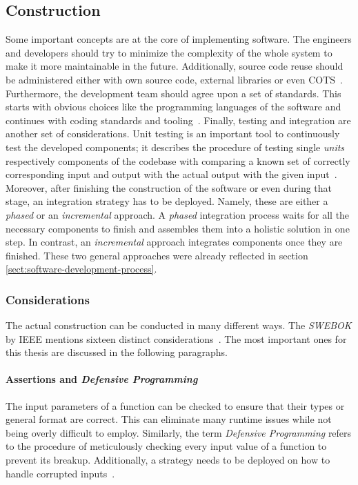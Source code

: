 \documentclass[12pt,a4paper]{report}
\begin{document}
\subsection{Construction} \label{subsect:construction}

Some important concepts are at the core of implementing software.
The engineers and developers should try to minimize the complexity of the whole system
to make it more maintainable in the future.
Additionally, source code reuse should be administered either with own source code,
external libraries or even COTS~\cite{swebok}.
Furthermore, the development team should agree upon a set of standards.
This starts with obvious choices like the programming languages of the software
and continues with coding standards and tooling~\cite{mcconnell-code-complete}.
Finally, testing and integration are another set of considerations.
Unit testing is an important tool to continuously test the developed components;
it describes the procedure of testing single \textit{units} respectively components
of the codebase with comparing a known set of correctly corresponding input and output
with the actual output with the given input~\cn.
Moreover, after finishing the construction of the software or even during that stage,
an integration strategy has to be deployed. Namely, these are either a
\textit{phased} or an \textit{incremental} approach. A \textit{phased} integration
process waits for all the necessary components to finish and assembles them into a
holistic solution in one step. In contrast, an \textit{incremental} approach
integrates components once they are finished. These two general approaches
were already reflected in section \ref{sect:software-development-process}.

\subsubsection{Considerations}
The actual construction can be conducted in many different ways.
The \textit{SWEBOK} by IEEE mentions sixteen distinct considerations~\cite{swebok}.
The most important ones for this thesis are discussed in the following paragraphs.

\paragraph{Assertions and \textit{Defensive Programming}}
The input parameters of a function can be checked to ensure that their types
or general format are correct. This can eliminate many runtime issues while not
being overly difficult to employ. Similarly, the term \textit{Defensive Programming}
refers to the procedure of meticulously checking every input value of a function
to prevent its breakup. Additionally, a strategy needs to be deployed on how to
handle corrupted inputs~\cite{swebok}.
\end{document}
